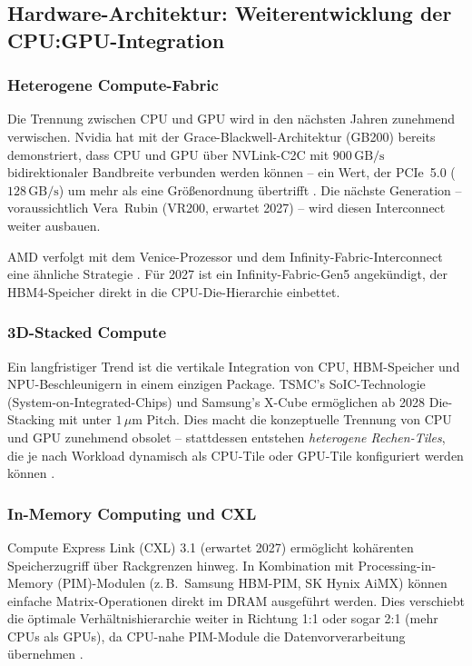 ﻿\documentclass[a4paper,12pt]{article}
\theoremstyle{definition}
\begin{document}
\subsection{Hardware-Architektur: Weiterentwicklung der CPU:GPU-Integration}

\subsubsection{Heterogene Compute-Fabric}

Die Trennung zwischen CPU und GPU wird in den n\"achsten Jahren zunehmend
verwischen. Nvidia hat mit der Grace-Blackwell-Architektur (GB200) bereits
demonstriert, dass CPU und GPU \"uber NVLink-C2C mit $900\,\text{GB/s}$
bidirektionaler Bandbreite verbunden werden k\"onnen -- ein Wert, der
PCIe~5.0 ($128\,\text{GB/s}$) um mehr als eine Gr\"o\ss enordnung \"ubertrifft
\cite{nvidia2024gb200}. Die n\"achste Generation -- voraussichtlich Vera~Rubin
(VR200, erwartet 2027) -- wird diesen Interconnect weiter ausbauen.

AMD verfolgt mit dem Venice-Prozessor und dem Infinity-Fabric-Interconnect
eine \"ahnliche Strategie \cite{computerbase2026}. F\"ur 2027 ist ein
Infinity-Fabric-Gen5 angek\"undigt, der HBM4-Speicher direkt in die
CPU-Die-Hierarchie einbettet.

\subsubsection{3D-Stacked Compute}

Ein langfristiger Trend ist die vertikale Integration von CPU, HBM-Speicher
und NPU-Beschleunigern in einem einzigen Package. TSMC's SoIC-Technologie
(System-on-Integrated-Chips) und Samsung's X-Cube erm\"oglichen ab 2028
Die-Stacking mit unter $1\,\mu\text{m}$ Pitch. Dies macht die konzeptuelle
Trennung von CPU und GPU zunehmend obsolet -- stattdessen entstehen
\emph{heterogene Rechen-Tiles}, die je nach Workload dynamisch als
CPU-Tile oder GPU-Tile konfiguriert werden k\"onnen \cite{tsmc2025soic}.

\subsubsection{In-Memory Computing und CXL}

Compute Express Link (CXL) 3.1 (erwartet 2027) erm\"oglicht kohärenten
Speicherzugriff \"uber Rackgrenzen hinweg. In Kombination mit
Processing-in-Memory (PIM)-Modulen (z.\,B.\ Samsung HBM-PIM, SK Hynix
AiMX) k\"onnen einfache Matrix-Operationen direkt im DRAM ausgef\"uhrt
werden. Dies verschiebt die \"optimale Verh\"altnishierarchie weiter in
Richtung 1:1 oder sogar 2:1 (mehr CPUs als GPUs), da CPU-nahe
PIM-Module die Datenvorverarbeitung \"ubernehmen \cite{cxl2024spec}.
\end{document}

